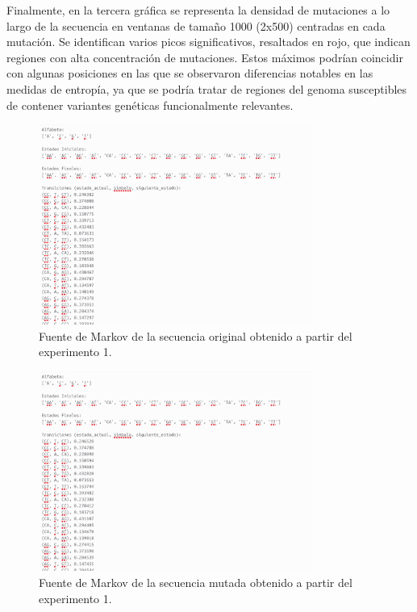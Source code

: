 \documentclass[11pt,spanish,listoffigures,listoftables]{tfgetsinf}
\begin{document}
Finalmente, en la tercera gráfica se representa la densidad de mutaciones a lo largo de la secuencia en ventanas de tamaño 1000 (2x500) centradas en cada mutación. Se identifican varios picos significativos, resaltados en rojo, que indican regiones con alta concentración de mutaciones. Estos máximos podrían coincidir con algunas posiciones en las que se observaron diferencias notables en las medidas de entropía, ya que se podría tratar de regiones del genoma susceptibles de contener variantes genéticas funcionalmente relevantes.  

\begin{figure}[H]
      \centering
      \includegraphics[width=0.8\textwidth]{aut1_exp1.png}
      \caption{Fuente de Markov de la secuencia original obtenido a partir del experimento 1.}
      \label{fig:etiqueta_opcional13}
\end{figure}

\begin{figure}[H]
      \centering
      \includegraphics[width=0.8\textwidth]{aut2_exp1.png}
      \caption{Fuente de Markov de la secuencia mutada obtenido a partir del experimento 1.}
      \label{fig:etiqueta_opcional14}
\end{figure}
\end{document}
